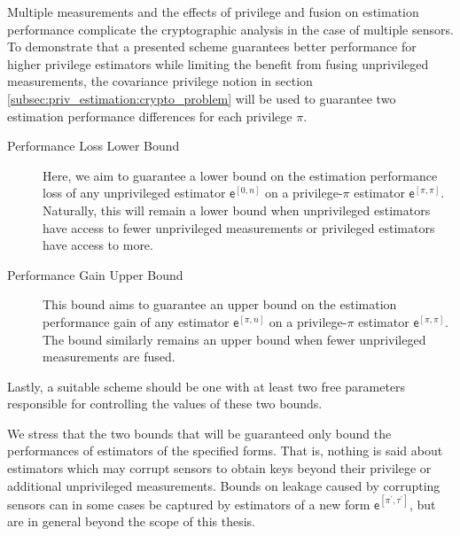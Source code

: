 Multiple measurements and the effects of privilege and fusion on estimation performance complicate the cryptographic analysis in the case of multiple sensors. To demonstrate that a presented scheme guarantees better performance for higher privilege estimators while limiting the benefit from fusing unprivileged measurements, the covariance privilege notion in section \ref{subsec:priv_estimation:crypto_problem} will be used to guarantee two estimation performance differences for each privilege $\pi$.
\begin{description}
    \item[Performance Loss Lower Bound] Here, we aim to guarantee a lower bound on the estimation performance loss of any unprivileged estimator $\mathsf{e}^{[0, n]}$ on a privilege-$\pi$ estimator $\mathsf{e}^{[\pi,\pi]}$. Naturally, this will remain a lower bound when unprivileged estimators have access to fewer unprivileged measurements or privileged estimators have access to more.
    \item[Performance Gain Upper Bound] This bound aims to guarantee an upper bound on the estimation performance gain of any estimator $\mathsf{e}^{[\pi, n]}$ on a privilege-$\pi$ estimator $\mathsf{e}^{[\pi,\pi]}$. The bound similarly remains an upper bound when fewer unprivileged measurements are fused.
\end{description}
Lastly, a suitable scheme should be one with at least two free parameters responsible for controlling the values of these two bounds.
\begin{remark}
  We stress that the two bounds that will be guaranteed only bound the performances of estimators of the specified forms. That is, nothing is said about estimators which may corrupt sensors to obtain keys beyond their privilege or additional unprivileged measurements. Bounds on leakage caused by corrupting sensors can in some cases be captured by estimators of a new form $\mathsf{e}^{[\pi^\prime,\tau^\prime]}$, but are in general beyond the scope of this thesis.
\end{remark}


% 
%                                                                                
%                                                                                
%                                                                                
% 

